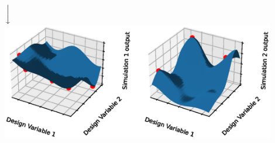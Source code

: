 \documentclass[aspectratio=169]{beamer}
\newcommand{\xdownarrow}[1]{%
  {\left\downarrow\vbox to #1{}\right.\kern-\nulldelimiterspace}
}
\begin{document}
\begin{frame}
\begin{columns}
\begin{column}{0.4\textwidth}
\begin{center}
\\
\medskip
$\xdownarrow{0.5cm}$\\
\medskip
\includegraphics[width=0.9\textwidth]{rsm.eps}%
\end{center}
\end{column}
\end{columns}
\end{frame}
\end{document}
